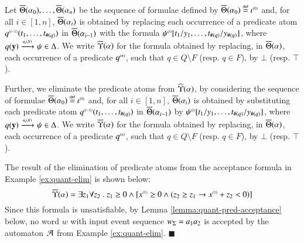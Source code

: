 \ifLongVersion
\begin{definition}\label{def:substform}
  Let $\overline{\Theta}({\alpha_0}), \ldots, \overline{\Theta}({\alpha_n})$ be the
  sequence of formulae defined by $\overline{\Theta}({\alpha_0}) \stackrel{\scriptscriptstyle{\mathsf{def}}}{=}
  {\iota}^{\scriptscriptstyle{({0})}}$ and, for all $i \in [1,n]$,
  $\overline{\Theta}({\alpha_i})$ is obtained by replacing each occurrence of
  a predicate atom ${q}^{\scriptscriptstyle{({i-1})}}(t_1,\ldots,t_{\#(q)})$ in
  $\overline{\Theta}({\alpha_{i-1}})$ with the formula
  ${\psi}^{\scriptscriptstyle{({i})}}[t_1/y_1,\ldots,t_{\#(q)}/y_{\#(q)}]$, where
  $q(\mathbf y) \xrightarrow{{\scriptscriptstyle a_{i}(X)}}_{{\scriptstyle }} \psi \in \Delta$. We write
  $\overline{\Upsilon}({\alpha})$ for the formula obtained by replacing, in
  $\overline{\Theta}({\alpha})$, each occurrence of a predicate
  ${q}^{\scriptscriptstyle{({n})}}$, such that $q \in Q \setminus F$ (resp. $q \in F$),
  by $\bot$ (resp. $\top$).
\end{definition}
\else
Further, we eliminate the predicate atoms from $\widehat{\Upsilon}({\alpha})$,
by considering the sequence of formulae $\overline{\Theta}({\alpha_0}) \stackrel{\scriptscriptstyle{\mathsf{def}}}{=}
{\iota}^{\scriptscriptstyle{({0})}}$ and, for all $i \in [1,n]$, $\overline{\Theta}({\alpha_i})$
is obtained by substituting each predicate atom
${q}^{\scriptscriptstyle{({i-1})}}(t_1,\ldots,t_{\#(q)})$ in $\overline{\Theta}({\alpha_{i-1}})$
by ${\psi}^{\scriptscriptstyle{({i})}}[t_1/y_1,\ldots,t_{\#(q)}/y_{\#(q)}]$, where
$q(\mathbf y) \xrightarrow{{\scriptscriptstyle a_{i}(X)}}_{{\scriptstyle }} \psi \in \Delta$. We write
$\overline{\Upsilon}({\alpha})$ for the formula obtained by replacing, in
$\overline{\Theta}({\alpha})$, each occurrence of a predicate ${q}^{\scriptscriptstyle{({n})}}$,
such that $q \in Q \setminus F$ (resp. $q \in F$), by $\bot$
(resp. $\top$).
\fi
\begin{example}\label{ex:pred-elim}
  The result of the elimination of predicate atoms from the acceptance
  formula in Example \ref{ex:quant-elim} is shown below:
  \[\overline{\Upsilon}({\alpha}) = 
  \exists z_1 \forall z_2 ~.~ z_1 \geq 0 \wedge 
          [{x}^{\scriptscriptstyle{({1})}} \geq 0 \wedge (z_2 \geq z_1 \rightarrow
            {x}^{\scriptscriptstyle{({1})}}+z_2 < 0)]\] Since this formula is
          unsatisfiable, by Lemma \ref{lemma:quant-pred-acceptance}
          below, no word $w$ with input event sequence ${w}_\Sigma =
          a_1a_2$ is accepted by the automaton $\mathcal{A}$ from Example
          \ref{ex:quant-elim}. \hfill$\blacksquare$
\end{example}


